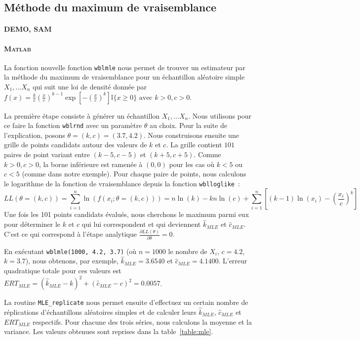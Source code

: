 \subsection{Méthode du maximum de vraisemblance}
\paragraph{DEMO, SAM}

\paragraph{\textsc{Matlab}}
La fonction nouvelle fonction \texttt{wblmle} nous permet de trouver un estimateur par la méthode du maximum de vraisemblance pour un échantillon aléatoire simple ${X_1,...X_n}$ qui suit une loi de densité donnée par
$ f(x)= \frac{k}{c} \left(\frac{x}{c}\right)^{k-1} \exp \left[ -\left(\frac{x}{c}\right)^{k}\right] \mathbb{I}\{x \geq 0\} \text{ avec } k>0, c>0$.

La première étape consiste à générer un échantillon $X_1,...X_n$. Nous utilisons pour ce faire la fonction \texttt{wblrnd} avec un paramètre  $\theta$ au choix. Pour la suite de l'explication, posons $\theta = (k,c) = (3.7, 4.2)$. Nous construisons ensuite une grille de points candidats autour des valeurs de $k$ et $c$. La grille contient $101$ paires de point variant entre $(k-5, c-5)$ et $(k+5, c+5)$. Comme $k>0, c>0$, la borne inférieure est ramenée à $(0,0)$ pour les cas où $k<5$ ou $c<5$ (comme dans notre exemple). Pour chaque paire de points, nous calculons le logarithme de la fonction de vraisemblance depuis la fonction \texttt{wblloglike}~:
$$LL(\theta=(k,c)) = \sum_{i=1}^{n}{\ln(f(x_i;\theta=(k,c)))} = n\ln(k) - kn\ln(c) + \sum_{i=1}^{n}{\left[(k-1)\ln(x_i) - \left(\frac{x_i}{c}\right)^{k}\right]}$$
Une fois les 101 points candidats évalués, nous cherchons le maximum parmi eux pour déterminer le $k$ et $c$ qui lui correspondent et qui deviennent $\hat{k}_{MLE}$ et $\hat{c}_{MLE}$. C'est ce qui correspond à l'étape analytique $\frac{\partial LL(\theta)}{\partial \theta} = 0$.

En exécutant \texttt{wblmle(1000, 4.2, 3.7)} (où $n = 1000$ le nombre de $X_i$, $c = 4.2$, $k = 3.7$), nous obtenons, par exemple, $\hat{k}_{MLE} = 3.6540$ et $\hat{c}_{MLE} = 4.1400$.
L'erreur quadratique totale pour ces valeurs est $ERT_{MLE} = (\hat{k}_{MLE} - k)^2 + (\hat{c}_{MLE} - c)^2 = 0.0057$.

La routine \texttt{MLE\_replicate} nous permet ensuite d'effectuez un certain nombre de réplications d'échantillons aléatoires simples et de calculer leurs $\hat{k}_{MLE}$, $\hat{c}_{MLE}$ et $ERT_{MLE}$ respectifs. Pour chacune des trois séries, nous calculons la moyenne et la variance. Les valeurs obtenues sont reprises dans la table~\ref{table:mle}.

